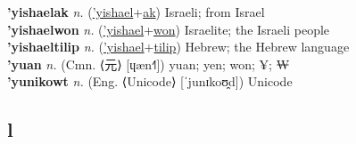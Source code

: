 \textbf{'yishaelak} \textit{n.} (\hyperref['yishael]{'yishael}+\hyperref[ak]{ak})
Israeli; from Israel \label{'yishaelak} \\
\textbf{'yishaelwon} \textit{n.} (\hyperref['yishael]{'yishael}+\hyperref[won]{won})
Israelite; the Israeli people \label{'yishaelwon} \\
\textbf{'yishaeltilip} \textit{n.} (\hyperref['yishael]{'yishael}+\hyperref[tilip]{tilip})
Hebrew; the Hebrew language \label{'yishaeltilip} \\
\textbf{'yuan} \textit{n.} (Cmn. ⟨元⟩ [ɥæn˧˥])
yuan; yen; won; ¥; ₩ \label{'yuan} \\
\textbf{'yunikowt} \textit{n.} (Eng. ⟨Unicode⟩ [ˈjunɪkoʊ̯d])
Unicode \label{'yunikowt} \\
\subsection{l}

